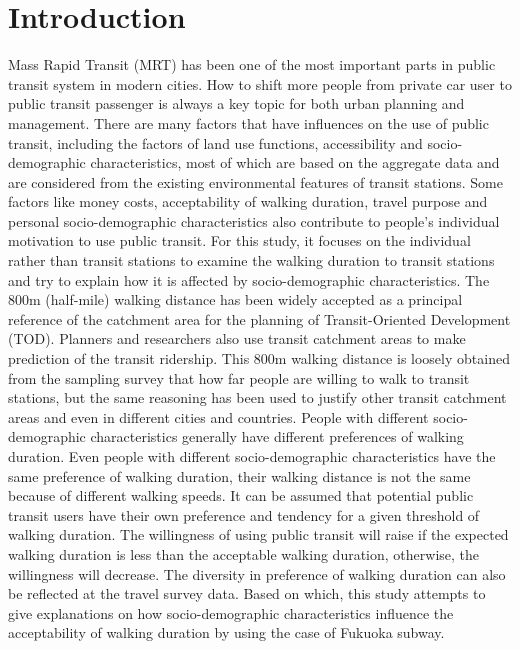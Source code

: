 \documentclass[Journal,letterpaper]{ascelike-new}
\begin{document}
\section{Introduction}
Mass Rapid Transit (MRT) has been one of the most important parts in public transit system in modern cities. How to shift more people from private car user to public transit passenger is always a key topic for both urban planning and management. There are many factors that have influences on the use of public transit, including the factors of land use functions, accessibility and socio-demographic characteristics, most of which are based on the aggregate data and are considered from the existing environmental features of transit stations. Some factors like money costs, acceptability of walking duration, travel purpose and personal socio-demographic characteristics also contribute to people’s individual motivation to use public transit. For this study, it focuses on the individual rather than transit stations to examine the walking duration to transit stations and try to explain how it is affected by socio-demographic characteristics.
%
The 800m (half-mile) walking distance has been widely accepted as a principal reference of the catchment area for the planning of Transit-Oriented Development (TOD). Planners and researchers also use transit catchment areas to make prediction of the transit ridership. This 800m walking distance is loosely obtained from the sampling survey that how far people are willing to walk to transit stations, but the same reasoning has been used to justify other transit catchment areas and even in different cities and countries. People with different socio-demographic characteristics generally have different preferences of walking duration. Even people with different socio-demographic characteristics have the same preference of walking duration, their walking distance is not the same because of different walking speeds. It can be assumed that potential public transit users have their own preference and tendency for a given threshold of walking duration. The willingness of using public transit will raise if the expected walking duration is less than the acceptable walking duration, otherwise, the willingness will decrease. The diversity in preference of walking duration can also be reflected at the travel survey data. Based on which, this study attempts to give explanations on how socio-demographic characteristics influence the acceptability of walking duration by using the case of Fukuoka subway.
%
\end{document}
